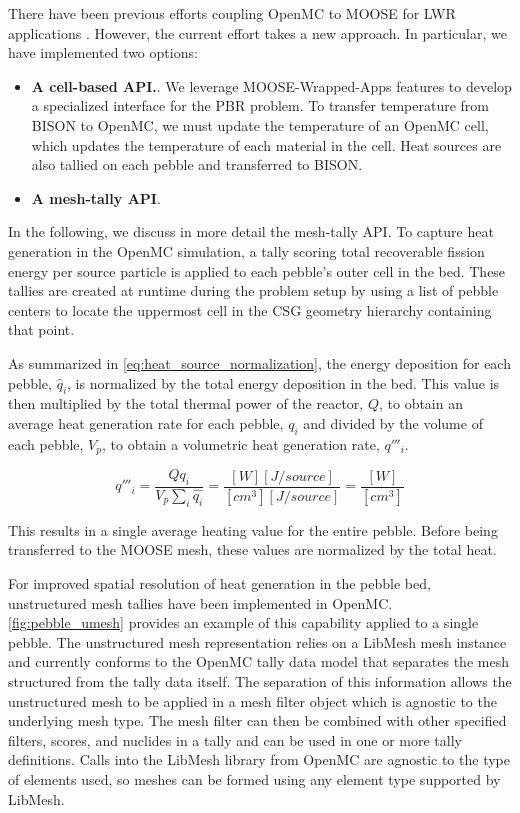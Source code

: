 There have been previous efforts coupling OpenMC to MOOSE for LWR applications \cite{ellis2017preliminary}.
However, the current effort takes a new approach. In particular, we have implemented two options:
\begin{itemize}
    \item \textbf{A cell-based API.}.  We leverage MOOSE-Wrapped-Apps features to develop a specialized interface for the PBR problem. To transfer temperature from BISON to OpenMC, we must update the temperature of an OpenMC cell, which updates the temperature of each material in the cell. Heat sources are also tallied on each pebble and transferred to BISON.
    \item \textbf{A mesh-tally API}.
\end{itemize}

In the following, we discuss in more detail the mesh-tally API. To capture heat generation in the OpenMC simulation, a tally scoring total recoverable fission energy per source particle is applied to each pebble's outer cell in the bed. These tallies are created at runtime during the problem setup by using a list of pebble centers to locate the uppermost cell in the CSG geometry hierarchy containing that point.

As summarized in \autoref{eq:heat_source_normalization}, the energy deposition for each pebble, $\hat{q}_{i}$, is normalized by the total energy deposition in the bed.  This value is then multiplied by the total thermal power of the reactor, $Q$, to obtain an average heat generation rate for each pebble, $q_i$ and divided by the volume of each pebble, $V_p$, to obtain a volumetric heat generation rate, $q'''_i$.

\begin{equation}
    \label{eq:heat_source_normalization}
    q'''_i = \frac{Q q_i}{V_{p}\sum_{i}{\hat{q_i}}} = \frac{[W][J/source]}{[cm^{3}] [J/source]} = \frac{[W]}{[cm^{3}]}
\end{equation}

This results in a single average heating value for the entire pebble. Before being transferred to the MOOSE mesh, these values are normalized by the total heat.

For improved spatial resolution of heat generation in the pebble bed, unstructured mesh tallies have been implemented in OpenMC. \autoref{fig:pebble_umesh} provides an example of this capability applied to a single pebble. The unstructured mesh representation relies on a LibMesh mesh instance and currently conforms to the OpenMC tally data model that separates the mesh structured from the tally data itself. The separation of this information allows the unstructured mesh to be applied in a mesh filter object which is agnostic to the underlying mesh type. The mesh filter can then be combined with other specified filters, scores, and nuclides in a tally and can be used in one or more tally definitions. Calls into the LibMesh library from OpenMC are agnostic to the type of elements used, so meshes can be formed using any element type supported by LibMesh.


